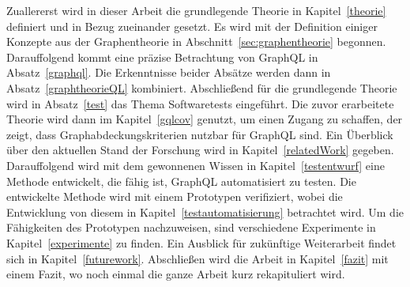 Zuallererst wird in dieser Arbeit die grundlegende Theorie in Kapitel~\ref{theorie} definiert und in Bezug zueinander gesetzt.
Es wird mit der Definition einiger Konzepte aus der Graphentheorie in Abschnitt~\ref{sec:graphentheorie} begonnen.
Darauffolgend kommt eine präzise Betrachtung von GraphQL in Absatz~\ref{graphql}.
Die Erkenntnisse beider Absätze werden dann in Absatz~\ref{graphtheorieQL} kombiniert.
Abschließend für die grundlegende Theorie wird in Absatz~\ref{test} das Thema Softwaretests eingeführt.
Die zuvor erarbeitete Theorie wird dann im Kapitel~\ref{gqlcov} genutzt, um einen Zugang zu schaffen, der zeigt, dass Graphabdeckungskriterien nutzbar für GraphQL sind.
Ein Überblick über den aktuellen Stand der Forschung wird in Kapitel~\ref{relatedWork} gegeben.
Darauffolgend wird mit dem gewonnenen Wissen in Kapitel~\ref{testentwurf} eine Methode entwickelt, die fähig ist, GraphQL automatisiert zu testen.
Die entwickelte Methode wird mit einem Prototypen verifiziert, wobei die Entwicklung von diesem in Kapitel~\ref{testautomatisierung} betrachtet wird.
Um die Fähigkeiten des Prototypen nachzuweisen, sind verschiedene Experimente in Kapitel~\ref{experimente} zu finden.
Ein Ausblick für zukünftige Weiterarbeit findet sich in Kapitel~\ref{futurework}.
Abschließen wird die Arbeit in Kapitel~\ref{fazit} mit einem Fazit, wo noch einmal die ganze Arbeit kurz rekapituliert wird.
